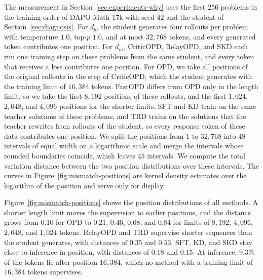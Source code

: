The measurement in Section~\ref{sec:experiments-why} uses the first $256$ problems in the training order of DAPO-Math-17k with seed $42$ and the student of Section~\ref{sec:diagnosis}.
For $d_\theta$, the student generates four rollouts per problem with temperature $1.0$, top-$p$ $1.0$, and at most $32{,}768$ tokens, and every generated token contributes one position.
For $d_m$, CriticOPD, RelayOPD, and SKD each run one training step on these problems from the same student, and every token that receives a loss contributes one position.
For OPD, we take all positions of the original rollouts in the step of CriticOPD, which the student generates with the training limit of $16{,}384$ tokens.
FastOPD differs from OPD only in the length limit, so we take the first $8{,}192$ positions of these rollouts, and the first $1{,}024$, $2{,}048$, and $4{,}096$ positions for the shorter limits.
SFT and KD train on the same teacher solutions of these problems, and TRD trains on the solutions that the teacher rewrites from rollouts of the student, so every response token of these data contributes one position.
We split the positions from $1$ to $32{,}768$ into $48$ intervals of equal width on a logarithmic scale and merge the intervals whose rounded boundaries coincide, which leaves $45$ intervals.
We compute the total variation distance between the two position distributions over these intervals.
The curves in Figure~\ref{fig:mismatch-positions} are kernel density estimates over the logarithm of the position and serve only for display.

Figure~\ref{fig:mismatch-positions} shows the position distributions of all methods.
A shorter length limit moves the supervision to earlier positions, and the distance grows from $0.10$ for OPD to $0.21$, $0.46$, $0.68$, and $0.84$ for limits of $8{,}192$, $4{,}096$, $2{,}048$, and $1{,}024$ tokens.
RelayOPD and TRD supervise shorter sequences than the student generates, with distances of $0.35$ and $0.53$.
SFT, KD, and SKD stay close to inference in position, with distances of $0.18$ and $0.15$.
At inference, $9.3\%$ of the tokens lie after position $16{,}384$, which no method with a training limit of $16{,}384$ tokens supervises.

